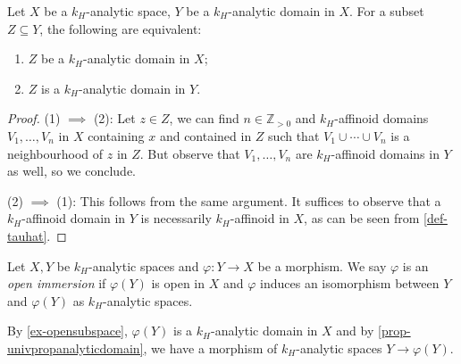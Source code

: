 \begin{proposition}\label{prop-analyticdomaininanalyticdomain}
    Let $X$ be a $k_H$-analytic space, $Y$ be a $k_H$-analytic domain in $X$. For a subset $Z\subseteq Y$, the following are equivalent:
    \begin{enumerate}
        \item $Z$ be a $k_H$-analytic domain in $X$;
        \item $Z$ is a $k_H$-analytic domain in $Y$.
    \end{enumerate}
\end{proposition}
\begin{proof}
    (1) $\implies$ (2):
    Let $z\in Z$, we can find $n\in \mathbb{Z}_{>0}$ and $k_H$-affinoid domains $V_1,\ldots,V_n$ in $X$ containing $x$ and contained in $Z$ such that $V_1\cup\cdots\cup V_n$ is a neighbourhood of $z$ in $Z$. But observe that $V_1,\ldots,V_n$ are $k_H$-affinoid domains in $Y$ as well, so we conclude.

    (2) $\implies$ (1): This follows from the same argument. It suffices to observe that a $k_H$-affinoid domain in $Y$ is necessarily $k_H$-affinoid in $X$, as can be seen from \cref{def-tauhat}.
\end{proof}


\begin{definition}
    Let $X,Y$ be $k_H$-analytic spaces and $\varphi:Y\rightarrow X$ be a morphism. We say $\varphi$ is an \emph{open immersion} if $\varphi(Y)$ is open in $X$ and $\varphi$ induces an isomorphism between $Y$ and $\varphi(Y)$ as $k_H$-analytic spaces. 
\end{definition}
By \cref{ex-opensubspace}, $\varphi(Y)$ is a $k_H$-analytic domain in $X$ and by \cref{prop-univpropanalyticdomain}, we have a morphism of $k_H$-analytic spaces $Y\rightarrow \varphi(Y)$.

